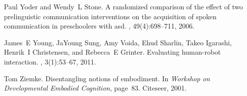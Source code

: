 \documentclass{ut-thesis}
\begin{document}
\begin{thebibliography}{100}
Paul Yoder and Wendy~L Stone.
\newblock A randomized comparison of the effect of two prelinguistic
  communication interventions on the acquisition of spoken communication in
  preschoolers with asd.
,
  49(4):698--711, 2006.

James~E Young, JaYoung Sung, Amy Voida, Ehud Sharlin, Takeo Igarashi, Henrik~I
  Christensen, and Rebecca~E Grinter.
\newblock Evaluating human-robot interaction.
, 3(1):53--67, 2011.

Tom Ziemke.
\newblock Disentangling notions of embodiment.
\newblock In {\em Workshop on Developmental Embodied Cognition}, page~83.
  Citeseer, 2001.

\end{thebibliography}


\end{document}
